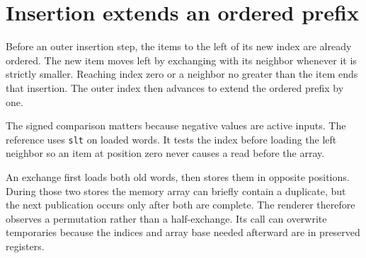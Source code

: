 \section{Insertion extends an ordered
  prefix}\label{009-sorting-visualizer-p05-insertion-extends-an-ordered-prefix}

Before an outer insertion step, the items to the left of its new index
are already ordered. The new item moves left by exchanging with its
neighbor whenever it is strictly smaller. Reaching index zero or a
neighbor no greater than the item ends that insertion. The outer index
then advances to extend the ordered prefix by one.

The signed comparison matters because negative values are active inputs.
The reference uses \texttt{slt} on loaded words. It tests the index
before loading the left neighbor so an item at position zero never
causes a read before the array.

An exchange first loads both old words, then stores them in opposite
positions. During those two stores the memory array can briefly contain
a duplicate, but the next publication occurs only after both are
complete. The renderer therefore observes a permutation rather than a
half-exchange. Its call can overwrite temporaries because the indices
and array base needed afterward are in preserved registers.
